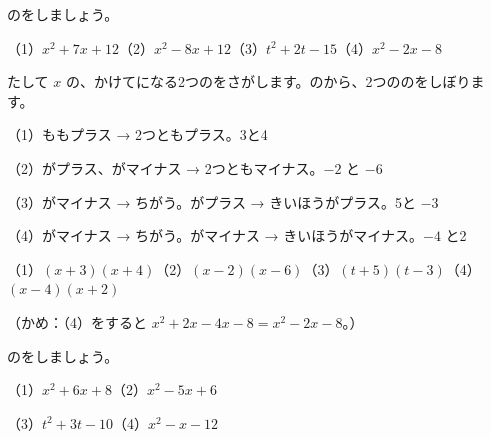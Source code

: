 \begin{reidai}[\R{和}{わ}と\R{積}{せき}で\R{因数分解}{いん|すう|ぶん|かい}する]
のをしましょう。\par
（1）\nobreak $x^2+7x+12$\quad（2）\nobreak $x^2-8x+12$\quad（3）\nobreak $t^2+2t-15$\quad（4）\nobreak $x^2-2x-8$\par
\kangaekata たして $x$ の、かけてになる2つのをさがします。のから、2つののをしぼります。\par
\shiki（1）\nobreak {}ももプラス → 2つともプラス。3と4\par
\hspace*{2.6\zw}（2）\nobreak {}がプラス、がマイナス → 2つともマイナス。$-2$ と $-6$\par
\hspace*{2.6\zw}（3）\nobreak {}がマイナス → ちがう。がプラス → きいほうがプラス。5と $-3$\par
\hspace*{2.6\zw}（4）\nobreak {}がマイナス → ちがう。がマイナス → きいほうがマイナス。$-4$ と2\par
\kotae（1）\nobreak $(x+3)(x+4)$\quad（2）\nobreak $(x-2)(x-6)$\quad（3）\nobreak $(t+5)(t-3)$\quad（4）\nobreak $(x-4)(x+2)$\par
（かめ：（4）\nobreak をすると $x^2+2x-4x-8=x^2-2x-8$。）
\end{reidai}



\begin{jibun}
のをしましょう。\par
（1）\nobreak $x^2+6x+8$\quad（2）\nobreak $x^2-5x+6$\par
（3）\nobreak $t^2+3t-10$\quad（4）\nobreak $x^2-x-12$
\end{jibun}

